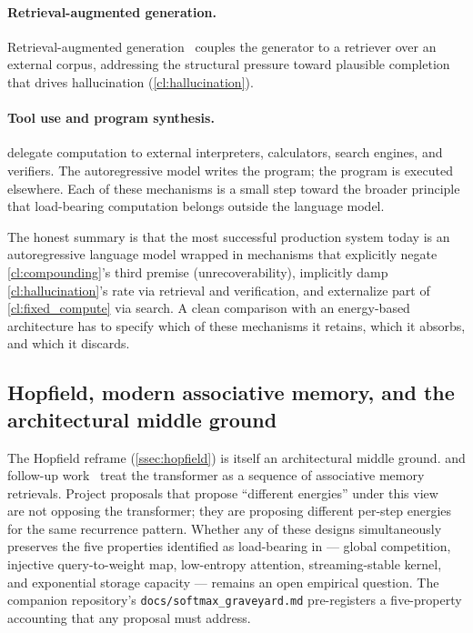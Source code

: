 \paragraph{Retrieval-augmented generation.}
Retrieval-augmented generation~\citep{lewis2020retrieval,izacard2023atlas,khattab2022demonstrate} couples the generator to a retriever over an external corpus, addressing the structural pressure toward plausible completion that drives hallucination (\ref{cl:hallucination}).
\paragraph{Tool use and program synthesis.}
\citet{schick2023toolformer,chen2022program,gao2023pal} delegate computation to external interpreters, calculators, search engines, and verifiers.
The autoregressive model writes the program;
the program is executed elsewhere.
Each of these mechanisms is a small step toward the broader principle that load-bearing computation belongs outside the language model.

The honest summary is that the most successful production system today is an autoregressive language model wrapped in mechanisms that explicitly negate \ref{cl:compounding}'s third premise (unrecoverability), implicitly damp \ref{cl:hallucination}'s rate via retrieval and verification, and externalize part of \ref{cl:fixed_compute} via search.
A clean comparison with an energy-based architecture has to specify which of these mechanisms it retains, which it absorbs, and which it discards.

\subsection{Hopfield, modern associative memory, and the architectural middle ground}
\label{ssec:hopfield_modern}

The Hopfield reframe (\cref{ssec:hopfield}) is itself an architectural middle ground.
\citet{ramsauer2020hopfield} and follow-up work~\citep{millidge2022universal,burns2024semantically} treat the transformer as a sequence of associative memory retrievals.
Project proposals that propose ``different energies'' under this view~\citep{krotov2021dense,hoover2024energy} are not opposing the transformer;
they are proposing different per-step energies for the same recurrence pattern.
Whether any of these designs simultaneously preserves the five properties identified as load-bearing in \citet{zhang2024hedgehog,han2024bridging,mongaras2025expressiveness} --- global competition, injective query-to-weight map, low-entropy attention, streaming-stable kernel, and exponential storage capacity --- remains an open empirical question.
The companion repository's \texttt{docs/softmax\_graveyard.md} pre-registers a five-property accounting that any proposal must address.
